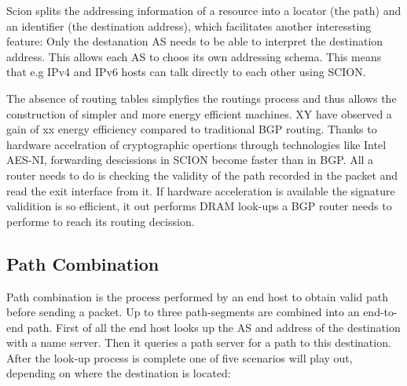 \documentclass[../eva1_scion.tex]{subfiles}
\begin{document}
    Scion splits the addressing information of a resource into a locator (the path) and an identifier (the destination address), which facilitates another interessting feature: Only the destanation AS needs to be able to interpret the destination address. This allows each AS to choos its own addressing schema. This means that e.g IPv4 and IPv6 hosts can talk directly to each other using SCION.

    The absence of routing tables simplyfies the routings process and thus allows the construction of simpler and more energy efficient machines. XY have observed a gain of xx  energy efficiency compared to traditional BGP routing. Thanks to hardware accelration of cryptographic opertions through technologies like Intel AES-NI, forwarding descissions in SCION become faster than in BGP. All a router needs to do is checking the validity of the path recorded in the packet and read the exit interface from it. If hardware acceleration is available the signature validition is so efficient, it out performs DRAM look-ups a BGP router needs to performe to reach its routing decission. 

    \subsection{Path Combination} \label{ssec:path_assembly}
    Path combination is the process performed by an end host to obtain valid path before sending a packet. Up to three path-segments are combined into an end-to-end path. First of all the end host looks up the AS and address of the destination with a name server. Then it queries a path server for a path to this destination. After the look-up process is complete one of five scenarios will play out, depending on where the destination is located:
\end{document}
